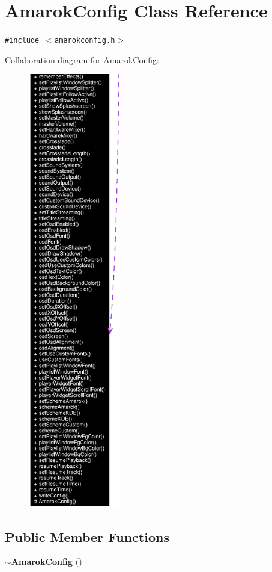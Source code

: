 \section{Amarok\-Config Class Reference}
\label{classAmarokConfig}
{\tt \#include $<$amarokconfig.h$>$}

Collaboration diagram for Amarok\-Config:\begin{figure}[H]
\begin{center}
\leavevmode
\includegraphics[width=115pt]{classAmarokConfig__coll__graph}
\end{center}
\end{figure}
\subsection*{Public Member Functions}
\begin{CompactItemize}
\item 
{\bf $\sim$Amarok\-Config} ()
\end{CompactItemize}
